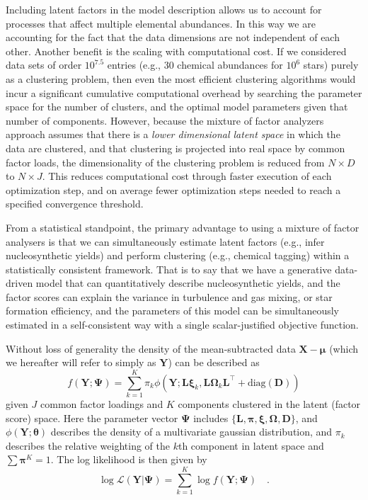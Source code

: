 \documentclass[twocolumn]{aastex62}
\newcommand{\vect}[1]{\boldsymbol{\mathbf{#1}}}
\renewcommand{\vec}[1]{\vect{#1}}
\newcommand{\weight}{\pi}
\newcommand{\data}{\textbf{Y}}
\newcommand{\vecdata}{\vec\data}
\newcommand{\vecdataunscaled}{\vec{X}}
\newcommand{\diag}[1]{\textrm{diag}(#1)}
\newcommand{\transpose}{^\intercal}
\newcommand{\eye}{\textbf{I}}
\newcommand{\factorloads}{\textbf{L}}
\newcommand{\specificvariance}{\vec{D}}
\newcommand{\scoremeans}{\vec\xi}
\newcommand{\scorecovs}{\vec\Omega}
\newcommand{\NumLatentFactors}{J}
\newcommand{\NumComponents}{K}
\newcommand{\numcomponents}{k}
\begin{document}
Including latent factors in the model description allows us to account for 
processes that affect multiple elemental abundances. In this way we are 
accounting for the fact that the data dimensions are not independent of
each other. Another benefit is the scaling with computational cost. If we 
considered data sets of order $10^{7.5}$
entries (e.g., 30 chemical abundances for $10^6$ stars) purely as a
clustering problem, then even the most efficient clustering
algorithms would incur a significant cumulative computational 
overhead by searching the parameter space for the number of
clusters, and the optimal model parameters given that number
of components. However, because the mixture of factor analyzers
approach assumes that there is a \emph{lower dimensional latent 
space} in which the data are clustered, and that clustering is 
projected into real space by common factor loads, the 
dimensionality of the clustering problem is reduced from 
$N \times D$ to $N \times J$. This reduces computational cost through
faster execution of each optimization step, and on average fewer optimization steps
needed to reach a specified convergence threshold.

From a statistical standpoint, the primary advantage to using
a mixture of factor analysers is that we can simultaneously
estimate latent factors (e.g., infer nucleosynthetic 
yields) and perform clustering (e.g., chemical tagging) 
within a statistically consistent framework. That is to say
that we have a generative data-driven model that can 
quantitatively describe nucleosynthetic yields, and the
factor scores can explain the variance in turbulence and gas mixing,
or star formation efficiency, and the parameters of this model
can be simultaneously estimated in a self-consistent way with
a single scalar-justified objective function.

Without loss of generality the density of the mean-subtracted 
data $\vecdataunscaled - \vec\mu$ (which we hereafter will refer to simply as $\vecdata$) can be described as
\begin{equation}
	f(\vecdata; \vec\Psi) = \sum_{\numcomponents=1}^{\NumComponents}\weight_\numcomponents\phi(\vecdata;\factorloads\scoremeans_\numcomponents, \factorloads\scorecovs_\numcomponents\factorloads\transpose + \diag{\specificvariance})
\end{equation}
\noindent{}given $\NumLatentFactors$ common factor loadings and $\NumComponents$ components
clustered in the latent (factor score) space. Here the parameter
vector
$\vec\Psi$ includes $\{\factorloads,\vec\pi,\scoremeans,\scorecovs,\specificvariance\}$, and $\phi(\vecdata; \vec\theta)$
describes the density of a multivariate gaussian distribution,
and $\weight_\numcomponents$ describes the relative weighting of the $\numcomponents$th
component in latent space and $\sum\vec\weight^K = 1$.
The log likelihood is then given by
\begin{equation}
	\log\mathcal{L}(\vecdata|\vec\Psi) = \sum_{\numcomponents=1}^{\NumComponents}\log{f(\vecdata;\vec\Psi)} \quad . \label{eq:log-likelihood}
\end{equation}
\end{document}

